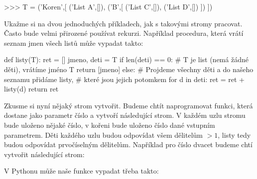 \begin{center}
\begin{minipage}{7cm}
\begin{python}
>>> T = ('Koren',[
	          ('List A',[]),
		  ('B',[
			('List C',[]),
			('List D',[])
			])
		  ])
\end{python}
\end{minipage}
\begin{minipage}{3.5cm}
\end{minipage}
\end{center}

Ukažme si na dvou jednoduchých příkladech, jak s takovými stromy pracovat. Často bude velmi přirozené používat rekurzi. Například procedura, 
která vrátí seznam jmen všech listů může vypadat takto:

\begin{python}
def listy(T):
  ret = []
  jmeno, deti = T
  if len(deti) == 0:
    # T je list (nemá žádné děti), vrátíme jméno T
    return [jmeno]
  else:
    # Projdeme všechny děti a do našeho seznamu přidáme listy,
    # které jsou jejich potomkem 
    for d in deti:
      ret = ret + listy(d)
  return ret
\end{python}

Zkusme si nyní nějaký strom vytvořit. Budeme chtít naprogramovat funkci, která dostane jako parametr číslo a vytvoří následující strom. V každém uzlu
stromu bude uloženo nějaké číslo, v kořeni bude uloženo číslo dané vstupním parametrem. Děti každého uzlu budou odpovídat všem dělitelům $>1$, listy
tedy budou odpovídat prvočíselným dělitelům. Například pro číslo dvacet budeme chtí vytvořit následující strom:
\begin{center}
\end{center}

V Pythonu může naše funkce vypadat třeba takto:

